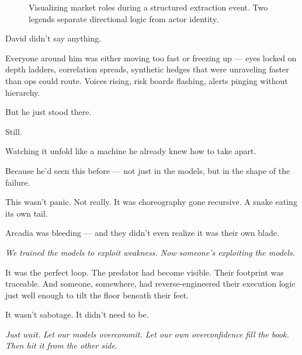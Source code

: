\begin{figure}[H]
  \caption{Visualizing market roles during a structured extraction event. Two legends separate directional logic from actor identity.}
\end{figure}

\medskip


David didn’t say anything.

Everyone around him was either moving too fast or freezing up — eyes locked on depth ladders, correlation spreads, synthetic hedges that were unraveling faster than ops could route. Voices rising, risk boards flashing, alerts pinging without hierarchy.

But he just stood there.

Still.

Watching it unfold like a machine he already knew how to take apart.

Because he’d seen this before — not just in the models, but in the shape of the failure.

This wasn’t panic. Not really. It was choreography gone recursive. A snake eating its own tail.

Arcadia was bleeding — and they didn’t even realize it was their own blade.

\textit{We trained the models to exploit weakness. Now someone’s exploiting the models.}

It was the perfect loop. The predator had become visible. Their footprint was traceable. And someone, somewhere, had reverse-engineered their execution logic just well enough to tilt the floor beneath their feet.

It wasn’t sabotage. It didn’t need to be.

\textit{Just wait. Let our models overcommit. Let our own overconfidence fill the book. Then hit it from the other side.}

